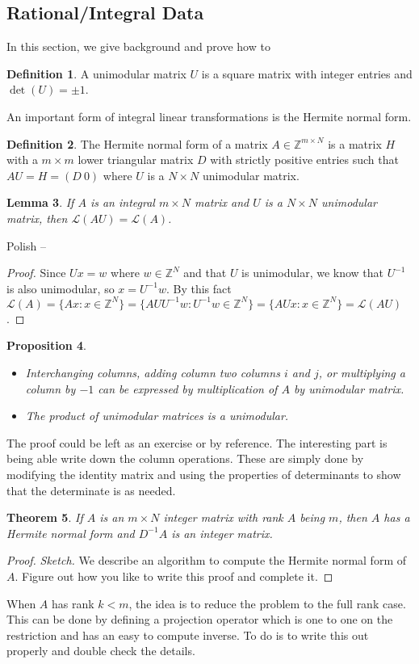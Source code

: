 \documentclass{article}
\newcommand{\Z}[0]{\mathbb{Z}}		%
\newcommand{\La}[0]{\mathcal L}
\newtheorem{thm}{Theorem}[section]
\newtheorem{lem}[thm]{Lemma}
\newtheorem{prop}[thm]{Proposition}
\theoremstyle{definition}
\newtheorem{defn}[thm]{Definition}
\theoremstyle{remark}
\begin{document}
\subsection{Rational/Integral Data}
In this section, we give background and prove how to 
\begin{defn}
A unimodular matrix $U$ is a square matrix with integer entries and $\det(U)=\pm 1$. %
\end{defn}
An important form of integral linear transformations is the Hermite normal form. 
\begin{defn}
The Hermite normal form of a matrix $A\in\Z^{m\times N}$ is a matrix $H$ with a $m\times m$ lower triangular matrix $D$ with strictly positive entries such that $AU = H = (D~0)$ where $U$ is a $N\times N$ unimodular matrix.
\end{defn}
\begin{lem}
If $A$ is an integral $m\times N$ matrix and $U$ is a $N\times N$ unimodular matrix, then $\La(AU) = \La(A)$. 
\end{lem}
{\color{blue}Polish --  
\begin{proof}
 Since $Ux = w$ where $w\in \Z^N$ and that $U$ is unimodular, we know that $U^{-1}$ is also unimodular, so $x = U^{-1}w$. By this fact $\La(A) = \{Ax :x\in \Z^N\} = \{AU U^{-1}w : U^{-1}w\in \Z^N \} =\{AU x : x\in \Z^N \} =\La(AU)$. 
 \end{proof}}
\begin{prop}
\begin{itemize}
    \item Interchanging columns, adding column two columns $i$ and $j$, or multiplying a column by $-1$ can be expressed by multiplication of $A$ by unimodular matrix. 
    \item The product of unimodular matrices is a unimodular. 
\end{itemize}
\end{prop}
The proof could be left as an exercise or by reference. The interesting part is being able write down the column operations. These are simply done by modifying the identity matrix and using the properties of determinants to show that the determinate is as needed. 
\begin{thm}\label{HNF}
If $A$ is an $m\times N$ integer matrix with rank $A$ being $m$, then $A$ has a Hermite normal form and $D^{-1}A$ is an integer matrix. 
\end{thm}
\begin{proof}
\textit{Sketch.}
We describe an algorithm to compute the Hermite normal form of $A$. {\color{blue} Figure out how you like to write this proof and complete it.} 
\end{proof}
{\color{red} When $A$ has rank $k<m$, the idea is to reduce the problem to the full rank case. This can be done by defining a projection operator which is one to one on the restriction and has an easy to compute inverse. To do is to write this out properly and double check the details. }
\end{document}
